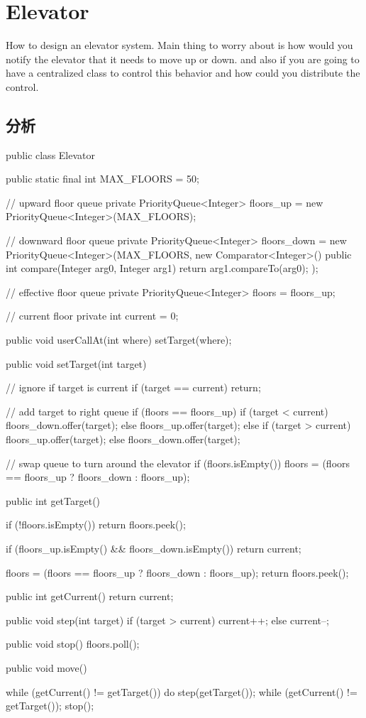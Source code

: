 \section{Elevator}
How to design an elevator system. Main thing to worry about is how would you notify the elevator that it needs to move up or down. and also if you are going to have a centralized 
class to control this behavior and how could you distribute the control.

\subsection{分析}
\begin{Code}
	public class Elevator {
		
		public static final int MAX_FLOORS = 50;
		
		// upward floor queue
		private PriorityQueue<Integer> floors_up = new PriorityQueue<Integer>(MAX_FLOORS);
		
		// downward floor queue
		private PriorityQueue<Integer> floors_down = new PriorityQueue<Integer>(MAX_FLOORS, new Comparator<Integer>(){
			public int compare(Integer arg0, Integer arg1) {
				return arg1.compareTo(arg0);
			}
		});
		
		// effective floor queue
		private PriorityQueue<Integer> floors = floors_up;
		
		// current floor
		private int current = 0;
		
		public void userCallAt(int where) {
			setTarget(where);
		}
		
		public void setTarget(int target) {
			
			// ignore if target is current
			if (target == current) {
				return;
			}
			
			// add target to right queue
			if (floors == floors_up) {
				if (target < current) {
					floors_down.offer(target);
				} else {
					floors_up.offer(target);
				}
			} else {
				if (target > current) {
					floors_up.offer(target);
				} else {
					floors_down.offer(target);
				}
			}

			// swap queue to turn around the elevator
			if (floors.isEmpty()) {
				floors = (floors == floors_up ? floors_down : floors_up);
			}
		}

		public int getTarget() {
	
			if (!floors.isEmpty()) {
				return floors.peek();
			}
	
			if (floors_up.isEmpty() && floors_down.isEmpty()) {
				return current;
			}
	
			floors = (floors == floors_up ? floors_down : floors_up);
			return floors.peek();
		}

		public int getCurrent() {
			return current;
		}

		public void step(int target) {
			if (target > current) {
				current++;
			} else {
				current--;
			}
		}

		public void stop() {
			floors.poll();
		}

		public void move() {
	
			while (getCurrent() != getTarget()) {
				do {
					step(getTarget());
				} while (getCurrent() != getTarget());
				stop();
			}
		}
	}
\end{Code}

